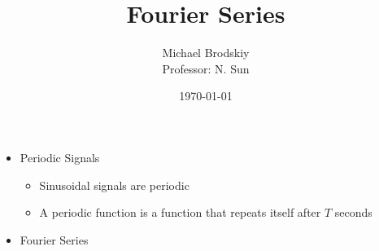 


\title{Fourier Series}
\date{\today}
\author{Michael Brodskiy\\ \small Professor: N. Sun}



\maketitle

\begin{itemize}

  \item Periodic Signals

    \begin{itemize}

      \item Sinusoidal signals are periodic

      \item A periodic function is a function that repeats itself after $T$ seconds

    \end{itemize}

  \item Fourier Series

    \begin{itemize}

    \end{itemize}

\end{itemize}



